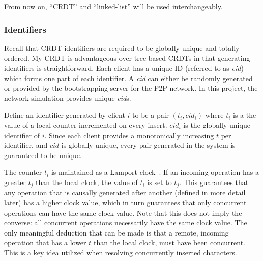 \documentclass[12pt,a4paper,twoside,openright]{report}
\begin{document}
		
		From now on, ``CRDT'' and ``linked-list'' will be used interchangeably.
	
		\subsubsection{Identifiers}
		
		Recall that CRDT identifiers are required to be globally unique and totally ordered. My CRDT is advantageous over tree-based CRDTs in that generating identifiers is straightforward. Each client has a unique ID (referred to as \textit{cid}) which forms one part of each identifier. A \textit{cid} can either be randomly generated or provided by the bootstrapping server for the P2P network. In this project, the network simulation provides unique \textit{cid}s.
		
		Define an identifier generated by client $i$ to be a pair $(t_i, cid_i)$ where $t_i$ is a the value of a local counter incremented on every insert. $cid_i$ is the globally unique identifier of $i$. Since each client provides a monotonically increasing $t$ per identifier, and $cid$ is globally unique, every pair generated in the system is guaranteed to be unique.
		
		The counter $t_i$ is maintained as a Lamport clock~\cite{lamport1978}. If an incoming operation has a greater $t_j$ than the local clock, the value of $t_i$ is set to $t_j$. This guarantees that any operation that is causally generated after another (defined in more detail later) has a higher clock value, which in turn guarantees that only concurrent operations can have the same clock value. Note that this does not imply the converse: all concurrent operations necessarily have the same clock value. The only meaningful deduction that can be made is that a remote, incoming operation that has a lower $t$ than the local clock, must have been concurrent. This is a key idea utilized when resolving concurrently inserted characters.
		
\end{document}
